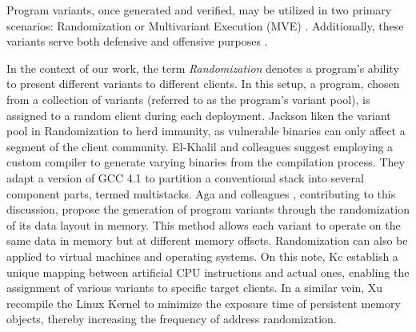 Program variants, once generated and verified, may be utilized in two primary scenarios: Randomization or Multivariant Execution (MVE) \cite{jackson}. 
Additionally, these variants serve both defensive and offensive purposes \cite{offensive_div}.


In the context of our work, the term \emph{Randomization} denotes a program's ability to present different variants to different clients. 
In this setup, a program, chosen from a collection of variants (referred to as the program's variant pool), is assigned to a random client during each deployment. 
Jackson \etal \cite{jackson} liken the variant pool in Randomization to herd immunity, as vulnerable binaries can only affect a segment of the client community. 
El-Khalil and colleagues \cite{ElKhalil2004} suggest employing a custom compiler to generate varying binaries from the compilation process. 
They adapt a version of GCC 4.1 to partition a conventional stack into several component parts, termed multistacks. 
Aga and colleagues \cite{aga2019smokestack}, contributing to this discussion, propose the generation of program variants through the randomization of its data layout in memory. 
This method allows each variant to operate on the same data in memory but at different memory offsets. 
Randomization can also be applied to virtual machines and operating systems. On this note, Kc \etal \cite{Kc03} establish a unique mapping between artificial CPU instructions and actual ones, enabling the assignment of various variants to specific target clients. 
In a similar vein, Xu \etal \cite{xu2020merr} recompile the Linux Kernel to minimize the exposure time of persistent memory objects, thereby increasing the frequency of address randomization.
\cite{cornucopia}


